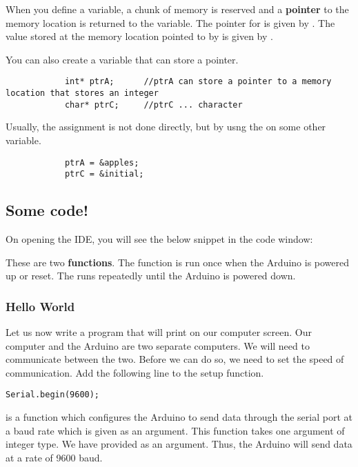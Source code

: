 \documentclass{article}
\begin{document}

			When you define a variable, a chunk of memory is reserved and a \textbf{pointer} to the memory location is returned to the variable. The pointer for  is given by . The value stored at the memory location pointed to by  is given by .

			You can also create a variable that can store a pointer.

			\begin{lstlisting}
			int* ptrA;		//ptrA can store a pointer to a memory location that stores an integer
			char* ptrC;		//ptrC ... character
			\end{lstlisting}

			Usually, the assignment is not done directly, but by usng the \inlncd{\&} on some other variable.

			\begin{lstlisting}
			ptrA = &apples;
			ptrC = &initial;
			\end{lstlisting}


	\subsection{Some code!}

		On opening the IDE, you will see the below snippet in the code window:

		

		These are two \textbf{functions}. The  function is run once when the Arduino is powered up or reset. The  runs repeatedly until the Arduino is powered down.

		\subsubsection{Hello World}
			Let us now write a program that will print  on our computer screen. Our computer and the Arduino are two separate computers. We will need to communicate between the two. Before we can do so, we need to set the speed of communication. Add the following line to the setup function.

			\begin{lstlisting}[firstnumber = 3]
			Serial.begin(9600);
			\end{lstlisting}

			 is a function which configures the Arduino to send data through the serial port at a baud rate which is given as an argument. This function takes one argument of integer type. We have provided  as an argument. Thus, the Arduino will send data at a rate of 9600 baud.
\end{document}
